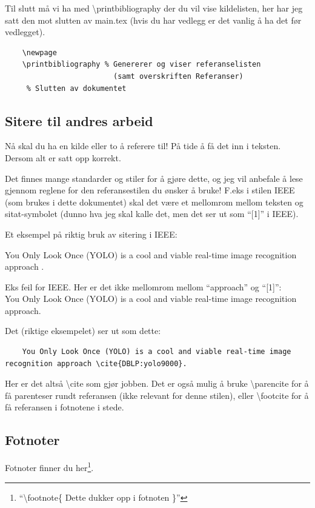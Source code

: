         Til slutt må vi ha med \textbackslash printbibliography der du vil vise kildelisten, her har jeg satt den mot slutten av main.tex (hvis du har vedlegg er det vanlig å ha det før vedlegget).
        
        \begin{verbatim}
    \newpage
    \printbibliography % Genererer og viser referanselisten 
                         (samt overskriften Referanser)
     % Slutten av dokumentet
        \end{verbatim}
        
        
    \subsection{Sitere til andres arbeid}
        Nå skal du ha en kilde eller to å referere til! På tide å få det inn i teksten. Dersom alt er satt opp korrekt.
        
        Det finnes mange standarder og stiler for å gjøre dette, og jeg vil anbefale å lese gjennom reglene for den referansestilen du ønsker å bruke! F.eks i stilen IEEE (som brukes i dette dokumentet) skal det være et mellomrom mellom teksten og sitat-symbolet (dunno hva jeg skal kalle det, men det ser ut som ``[1]'' i IEEE). 
        
        Et eksempel på riktig bruk av sitering i IEEE:
        
        You Only Look Once (YOLO) is a cool and viable real-time image recognition approach \cite{DBLP:yolo9000}. 
        
        Eks feil for IEEE. Her er det ikke mellomrom mellom ``approach'' og ``[1]'':\\
        You Only Look Once (YOLO) is a cool and viable real-time image recognition approach\cite{DBLP:yolo9000}.
        
        Det (riktige eksempelet) ser ut som dette:
        \begin{verbatim}
    You Only Look Once (YOLO) is a cool and viable real-time image recognition approach \cite{DBLP:yolo9000}. 
        \end{verbatim}
        
        Her er det altså \textbackslash cite som gjør jobben. Det er også mulig å bruke \textbackslash parencite for å få parenteser rundt referansen (ikke relevant for denne stilen), eller \textbackslash footcite for å få referansen i fotnotene i stede.
        
        
    \subsection{Fotnoter}
        Fotnoter finner du her\footnote{``\textbackslash footnote\{ Dette dukker opp i fotnoten \}''}.
        
